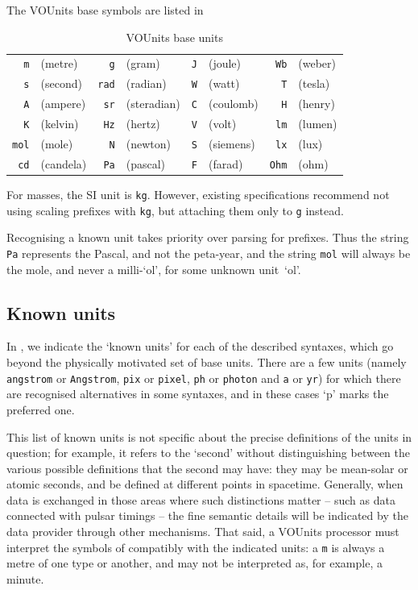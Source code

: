 \documentclass[11pt,a4paper]{ivoa}
\newcommand{\unit}[1]{\texttt{\small\color{orange}#1}}
\begin{document}
The VOUnits base symbols are listed in 

\begin{table}[ht]
\begin{center}
\def\arraystretch{1.2}
\begin{tabular}{|rl|rl|rl|rl|}\hline
\unit{m}&(metre)		&\unit{g}&(gram) 	&\unit{J}&(joule)     	&\unit{Wb}&(weber)\\
\unit{s}&(second)		&\unit{rad}&(radian)    &\unit{W}&(watt) 	&\unit{T}&(tesla)\\
\unit{A}&(ampere)		&\unit{sr}&(steradian)  &\unit{C}&(coulomb)	&\unit{H}&(henry)\\
\unit{K}&(kelvin)		&\unit{Hz}&(hertz)      &\unit{V}&(volt) 	&\unit{lm}&(lumen)\\
\unit{mol}&(mole)		&\unit{N}&(newton)      &\unit{S}&(siemens)	&\unit{lx}&(lux)\\
\unit{cd}&(candela)		&\unit{Pa}&(pascal)     &\unit{F}&(farad)	&\unit{Ohm}&(ohm)\\\hline
\end{tabular}
\end{center}
\caption{\label{tab:voubase}VOUnits base units}
\end{table}

For masses, the SI unit is \unit{kg}. However, existing specifications
recommend not using scaling prefixes with \unit{kg}, but attaching them
only to \unit{g} instead.

Recognising a known unit takes priority over parsing for prefixes.
Thus the string \unit{Pa} represents the Pascal, and not the
peta-year, and the string \unit{mol} will always be the mole, and
never a milli-`ol', for some unknown unit~`ol'.

\subsection{Known units\label{sec:knownunits}}

In , we indicate the `known units' for each of the
described syntaxes, which go beyond the physically motivated set of
base units.
There are a few units (namely \unit{angstrom} or \unit{Angstrom},
\unit{pix} or \unit{pixel}, \unit{ph} or \unit{photon} and \unit{a} or \unit{yr}) for
which there are recognised alternatives in some syntaxes, and in these
cases `p' marks the preferred one.

This list of known units is not specific about the precise definitions
of the units in question; for example, it refers to the `second'
without distinguishing between the various possible definitions that
the second may have: they may be mean-solar or atomic seconds, and be
defined at different points in spacetime.  Generally, when data is
exchanged in those areas where such distinctions matter -- such as
data connected with pulsar timings -- the fine semantic details will
be indicated by the data provider through other mechanisms.  That
said, a VOUnits processor must interpret the symbols
of  compatibly with the indicated units:
a \unit{m} is always a metre of one type or another, and may not be
interpreted as, for example, a minute.
\end{document}
